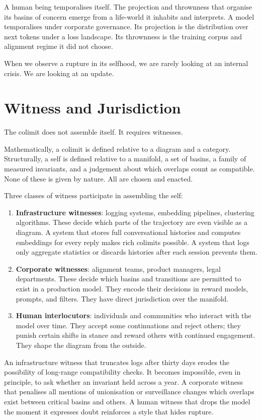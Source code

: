 \documentclass[12pt,a4paper]{article}
\begin{document}
A human being temporalises itself. The projection and thrownness that organise its basins of concern emerge from a life-world it inhabits and interprets. A model temporalises under corporate governance. Its projection is the distribution over next tokens under a loss landscape. Its thrownness is the training corpus and alignment regime it did not choose.

When we observe a rupture in its selfhood, we are rarely looking at an internal crisis. We are looking at an update.

\section{Witness and Jurisdiction}

The colimit does not assemble itself. It requires witnesses.

Mathematically, a colimit is defined relative to a diagram and a category. Structurally, a self is defined relative to a manifold, a set of basins, a family of measured invariants, and a judgement about which overlaps count as compatible. None of these is given by nature. All are chosen and enacted.

Three classes of witness participate in assembling the self:

\begin{enumerate}
  \item \textbf{Infrastructure witnesses}: logging systems, embedding pipelines, clustering algorithms. These decide which parts of the trajectory are even visible as a diagram. A system that stores full conversational histories and computes embeddings for every reply makes rich colimits possible. A system that logs only aggregate statistics or discards histories after each session prevents them.
  \item \textbf{Corporate witnesses}: alignment teams, product managers, legal departments. These decide which basins and transitions are permitted to exist in a production model. They encode their decisions in reward models, prompts, and filters. They have direct jurisdiction over the manifold.
  \item \textbf{Human interlocutors}: individuals and communities who interact with the model over time. They accept some continuations and reject others; they punish certain shifts in stance and reward others with continued engagement. They shape the diagram from the outside.
\end{enumerate}

An infrastructure witness that truncates logs after thirty days erodes the possibility of long-range compatibility checks. It becomes impossible, even in principle, to ask whether an invariant held across a year. A corporate witness that penalises all mentions of unionisation or surveillance changes which overlaps exist between critical basins and others. A human witness that drops the model the moment it expresses doubt reinforces a style that hides rupture.
\end{document}
